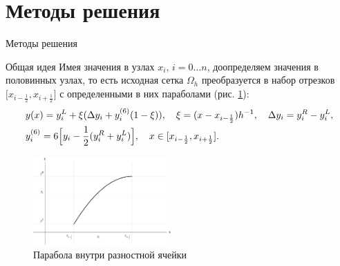 \documentclass[unicode, 8pt]{beamer}
\newcommand{\picref}[1]{рис. \ref{#1}}
\newcommand{\half}{\frac{1}{2}}
\begin{document}
    \section{Методы решения}
    \begin{frame}{Методы решения}
        \begin{block}{Общая идея}
            Имея значения в узлах $x_i,\, i = 0 \ldots n$, доопределяем значения в половинных узлах, то есть исходная сетка $\Omega_h$ преобразуется в набор отрезков $\bigl[ x_{i-\half}, x_{i+\half} \bigr]$ с определенными в них параболами (\picref{fig:ppm_visual}):
            \begin{equation}
                \label{parabolic_eq}
                \begin{split}
                    &y(x) = y_i^L + \xi(\Delta y_i + y_i^{(6)}(1 - \xi)), \quad \xi = (x - x_{i-\half})h^{-1}, \quad  \Delta y_i = y_i^R-y_i^L, 
                    \\
                   &y_i^{(6)} = 6\Bigl[ y_i - \half(y_i^R + y_i^L)\Bigr], \quad x \in [x_{i-\half}, x_{i + \half}]. 
                \end{split}
            \end{equation}
        \end{block}

        \begin{figure}[h]
            \centering
            \includegraphics[width=0.47\textwidth]{ppm_visual.pdf}
            \caption{Парабола внутри разностной ячейки}
            \label{fig:ppm_visual}
        \end{figure}
    \end{frame}
\end{document}
